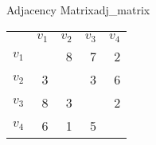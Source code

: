 \documentclass{tufte-handout}
\begin{document}
\begin{questions}

\begin{model}{Adjacency Matrix}{adj_matrix}
\begin{tabular}{ l r r r r }
      & $v_1$ & $v_2$ & $v_3$ & $v_4$ \\
$v_1$ &       & 8     & 7     & 2 \\
$v_2$ & 3     &       & 3     & 6 \\
$v_3$ & 8     & 3     &       & 2 \\
$v_4$ & 6     & 1     & 5     &   \\
\end{tabular}
\label{adj_matrix}
\end{model}


\end{questions}
\end{document}
